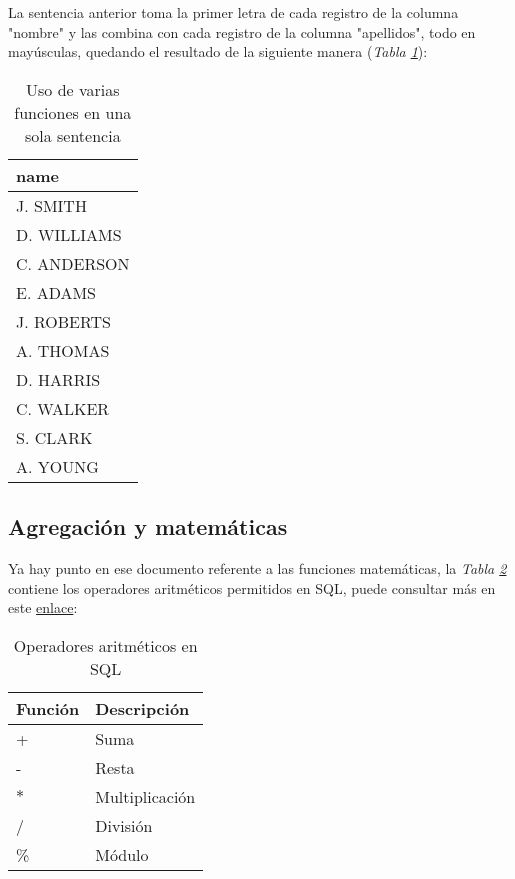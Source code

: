 La sentencia anterior toma la primer letra de cada registro de la columna "nombre" y las combina con cada registro de la columna "apellidos", todo en mayúsculas, quedando el resultado de la siguiente manera (\textit{Tabla \ref{tab: 28}}):
\begin{table}[H]
    \centering
    \caption{Uso de varias funciones en una sola sentencia}
    \label{tab: 28}
    \begin{tabular}{|l|}
        \hline
        \textbf{name} \\
        \hline
        J. SMITH \\
        \hline
        D. WILLIAMS \\
        \hline
        C. ANDERSON \\
        \hline
        E. ADAMS \\
        \hline
        J. ROBERTS \\
        \hline
        A. THOMAS \\
        \hline
        D. HARRIS \\
        \hline
        C. WALKER \\
        \hline
        S. CLARK \\
        \hline
        A. YOUNG \\
        \hline
    \end{tabular}
\end{table}



\subsection{Agregación y matemáticas}

Ya hay punto en ese documento referente a las funciones matemáticas, la \textit{Tabla \ref{tab: 29}} contiene los operadores aritméticos permitidos en SQL, puede consultar más en este \href{https://www.w3schools.com/sql/sql_operators.asp}{enlace}:
\begin{table}[H]
    \centering
    \caption{Operadores aritméticos en SQL}
    \label{tab: 29}
    \begin{tabular}{l l}
        \hline
        \textbf{Función} & \textbf{Descripción} \\
        \hline
        +   & Suma \\
        -   & Resta \\
        $*$   & Multiplicación \\
        /   & División \\
        \%  & Módulo \\
        \hline
    \end{tabular}
\end{table}

